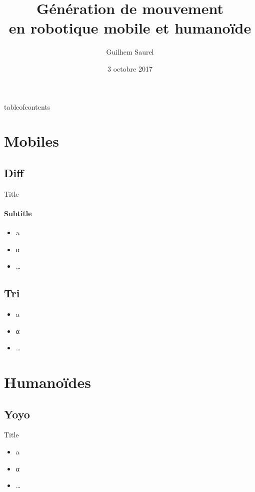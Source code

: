 \documentclass{beamer}
\title{Génération de mouvement \\ en robotique mobile et humanoïde}
\date{3 octobre 2017}
\author{Guilhem Saurel}
\begin{document}
\begin{frame}
    \titlepage
\end{frame}

\begin{frame}{tableofcontents}
    \tableofcontents
\end{frame}

\section{Mobiles}

\subsection{Diff}

\begin{frame}{Title}
\framesubtitle{Subtitle}
    \begin{itemize}
        \item a
        \item α
        \item …
    \end{itemize}
\end{frame}

\subsection{Tri}

\begin{frame}
    \begin{itemize}
        \item a
        \item α
        \item …
    \end{itemize}
\end{frame}

\section{Humanoïdes}

\subsection{Yoyo}

\begin{frame}{Title}
    \begin{itemize}
        \item a
        \item α
        \item …
    \end{itemize}
\end{frame}
\end{document}
